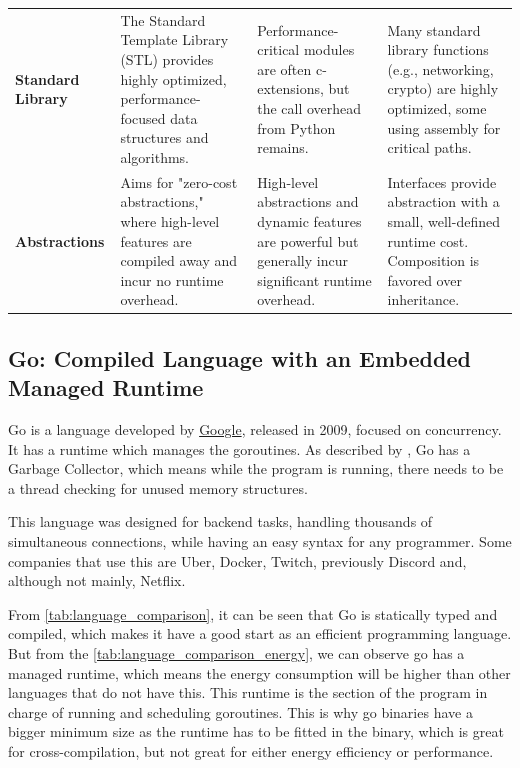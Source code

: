 \begin{table}
\begin{tabularx}{\textwidth}{
		>{\raggedright\arraybackslash}p{}
		>{\raggedright\arraybackslash}X
		>{\raggedright\arraybackslash}X
		>{\raggedright\arraybackslash}X
	}
		\textbf{Standard Library} &
		The Standard Template Library (STL) provides highly optimized, performance-focused data structures and algorithms. &
		Performance-critical modules are often \Glspl{c-extension}, but the call overhead from Python remains. &
		Many standard library functions (e.g., networking, crypto) are highly optimized, some using assembly for critical paths. \\
        \addlinespace

		\textbf{Abstractions} &
		Aims for "zero-cost abstractions," where high-level features are compiled away and incur no runtime overhead. &
		High-level abstractions and dynamic features are powerful but generally incur significant runtime overhead. &
		Interfaces provide abstraction with a small, well-defined runtime cost. Composition is favored over inheritance. \\
		\bottomrule
	\end{tabularx}
\end{table}



\subsection{Go: Compiled Language with an Embedded Managed Runtime}
Go is a language developed by \href{https://google.com}{Google}, released in 2009, focused on concurrency. It has a runtime which manages the \glspl{goroutine}. As described by \cite{rosecrance2019garbage}, Go has a Garbage Collector, which means while the program is running, there needs to be a thread checking for unused memory structures. 

This language was designed for backend tasks, handling thousands of simultaneous connections, while having an easy syntax for any programmer. Some companies that use this are Uber, Docker, Twitch, previously Discord \cite{discord-blog-go-rust} and, although not mainly, Netflix.

From \autoref{tab:language_comparison}, it can be seen that Go is statically typed and compiled, which makes it have a good start as an efficient programming language. But from the \autoref{tab:language_comparison_energy}, we can observe go has a managed runtime, which means the energy consumption will be higher than other languages that do not have this. This runtime is the section of the program in charge of running and scheduling \glspl{goroutine}. This is why go binaries have a bigger minimum size as the runtime has to be fitted in the binary, which is great for \gls{cross-compilation}, but not great for either energy efficiency or performance.

